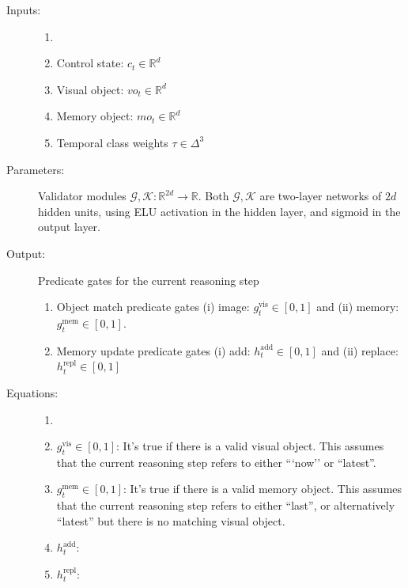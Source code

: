 \documentclass{article}
\theoremstyle{remark}
\theoremstyle{definition}
\newcommand{\Reals}{\mathbb{R}}
\newcommand{\cG}{\mathcal{G}}
\newcommand{\cK}{\mathcal{K}}
\newcommand{\imatch}{g^{\mathrm{vis}}}
\newcommand{\mmatch}{g^{\mathrm{mem}}}
\newcommand{\doadd}{h^{\mathrm{add}}}
\newcommand{\doreplace}{h^{\mathrm{repl}}}
\begin{document}
\begin{description}
	\item[Inputs:] 
	\begin{enumerate}
		\item[]
		\item Control state: $c_t \in \Reals^d$
		\item Visual object: $vo_t \in \Reals^d$
		\item Memory object: $mo_t \in \Reals^d$
		\item Temporal class weights $\tau \in \Delta^3$
	\end{enumerate}
	
	\item[Parameters:] Validator modules $\cG, \cK: \Reals^{2d} \to \Reals$.
	Both $\cG, \cK$ are two-layer networks of $2d$ hidden units,
	using ELU activation in the hidden layer, and sigmoid in the output layer.
	
	\item[Output:] Predicate gates for the current reasoning step
	\begin{enumerate}
    	\item Object match predicate gates (i) image: $\imatch_t \in [0,1]$ and 
    	(ii) memory: $\mmatch_t \in [0,1]$.
		
		\item Memory update predicate gates (i) add: $\doadd_t \in [0,1]$ and
		(ii) replace: $\doreplace_t \in [0,1]$
    \end{enumerate}

	\item[Equations:]
	\begin{enumerate}
		\item[]
		\item $\imatch_t \in [0,1]$:
		It's true if there is a valid visual object. This assumes that
		the current reasoning step refers to either ```now''  or ``latest''.
		
		\item$\mmatch_t \in [0,1]$:
		It's true if there is a valid memory object. This assumes that
		the current reasoning step refers to either ``last'',  or alternatively ``latest'' 
		but there is no matching visual object.
		
		\item $\doadd_t$:
		
		
		\item $\doreplace_t$: 
\end{enumerate}
\end{description}
\end{document}
